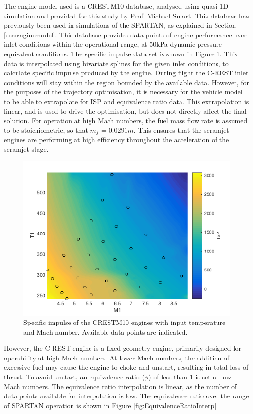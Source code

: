  The engine model used is a CRESTM10 database\cite{Preller2017,Preller2018}, analysed using quasi-1D simulation and provided for this study by Prof. Michael Smart. This database has previously been used in simulations of the SPARTAN, as explained in Section \ref{sec:enginemodel}.
This database provides data points of engine performance over inlet conditions within the operational range, at 50kPa dynamic pressure equivalent conditions. The specific impulse data set is shown in Figure \ref{fig:ISPinterp}. This data is interpolated using bivariate splines for the given inlet conditions, to calculate specific impulse produced by the engine. During flight the C-REST inlet conditions will stay within the region bounded by the available data. However, for the purposes of the trajectory optimisation, it is necessary for the vehicle model to be able to extrapolate for ISP and equivalence ratio data. This extrapolation is linear, and is used to drive the optimisation, but does not directly affect the final solution. 
For operation at high Mach numbers, the fuel mass flow rate is assumed to be stoichiometric, so that $\dot{m_f}$ = $0.0291\dot{m}$. This ensures that the scramjet engines are performing at high efficiency throughout the acceleration of the scramjet stage. 
\begin{figure}[ht]
	\centering
	\includegraphics[width=0.6\linewidth]{figures/3_vehicle_design/ISPinterp}
	\caption{Specific impulse of the CRESTM10 engines with input temperature and Mach number. Available data points are indicated.}
	\label{fig:ISPinterp}
\end{figure}
However, the C-REST engine is a fixed geometry engine, primarily designed for operability at high Mach numbers\cite{Preller2017}. At lower Mach numbers, the addition of excessive fuel may cause the engine to choke and unstart, resulting in total loss of thrust\cite{Preller2017}. To avoid unstart, an equivalence ratio ($\phi$) of less than 1 is set at low Mach numbers. The equivalence ratio interpolation is linear, as the number of data points available for interpolation is low. The equivalence ratio over the range of SPARTAN operation is shown in Figure \ref{fig:EquivalenceRatioInterp}.
